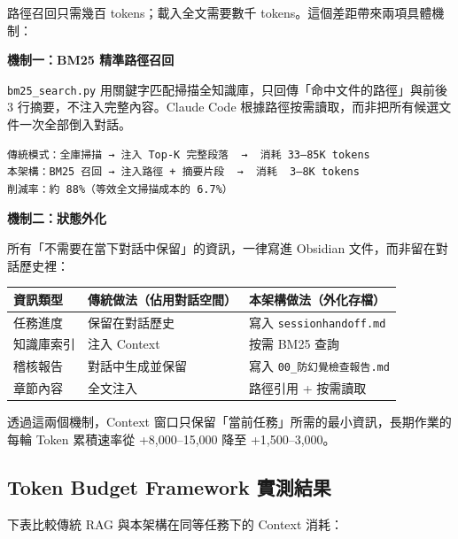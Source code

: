 路徑召回只需幾百 tokens；載入全文需要數千
tokens。這個差距帶來兩項具體機制：

\textbf{機制一：BM25 精準路徑召回}

\texttt{bm25\_search.py}
用關鍵字匹配掃描全知識庫，只回傳「命中文件的路徑」與前後 3
行摘要，不注入完整內容。Claude Code
根據路徑按需讀取，而非把所有候選文件一次全部倒入對話。

\begin{verbatim}
傳統模式：全庫掃描 → 注入 Top-K 完整段落  →  消耗 33–85K tokens
本架構：BM25 召回 → 注入路徑 + 摘要片段  →  消耗  3–8K tokens
削減率：約 88%（等效全文掃描成本的 6.7%）
\end{verbatim}

\textbf{機制二：狀態外化}

所有「不需要在當下對話中保留」的資訊，一律寫進 Obsidian
文件，而非留在對話歷史裡：

{\def\LTcaptype{none} %
\begin{longtable}[]{@{}lll@{}}
\toprule\noalign{}
資訊類型 & 傳統做法（佔用對話空間） & 本架構做法（外化存檔） \\
\midrule\noalign{}
\endhead
\bottomrule\noalign{}
\endlastfoot
任務進度 & 保留在對話歷史 & 寫入 \texttt{sessionhandoff.md} \\
知識庫索引 & 注入 Context & 按需 BM25 查詢 \\
稽核報告 & 對話中生成並保留 & 寫入 \texttt{00\_防幻覺檢查報告.md} \\
章節內容 & 全文注入 & 路徑引用 + 按需讀取 \\
\end{longtable}
}

透過這兩個機制，Context
窗口只保留「當前任務」所需的最小資訊，長期作業的每輪 Token 累積速率從
+8,000--15,000 降至 +1,500--3,000。

\subsection{Token Budget Framework
實測結果}\label{token-budget-framework-ux5be6ux6e2cux7d50ux679c}

下表比較傳統 RAG 與本架構在同等任務下的 Context 消耗：

